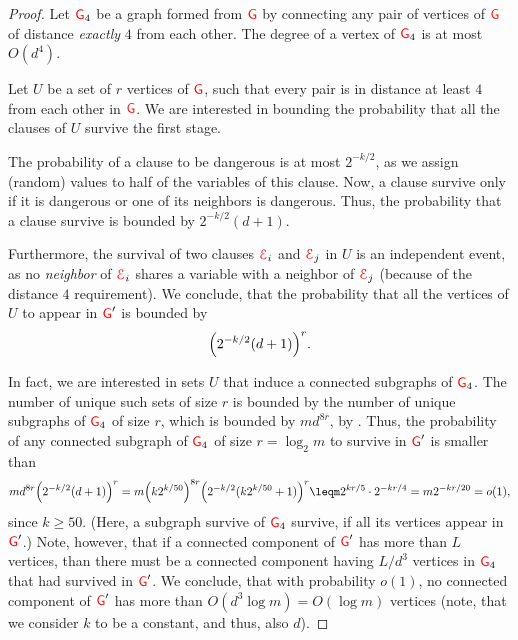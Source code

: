 \begin{proof}
    Let ${\textcolor{red}{\mathsf{G}}}_4$ be a graph formed from ${\textcolor{red}{\mathsf{G}}}$ by connecting any
    pair of vertices of ${\textcolor{red}{\mathsf{G}}}$ of distance {\em exactly} $4$
    from each other. The degree of a vertex of ${\textcolor{red}{\mathsf{G}}}_4$ is at
    most $O(d^4)$. 

    Let $U$ be a set of $r$ vertices of ${\textcolor{red}{\mathsf{G}}}$, such that
    every pair is in distance at least $4$ from each other
    in ${\textcolor{red}{\mathsf{G}}}$. We are interested in bounding the probability
    that all the clauses of $U$ survive the first stage. 
    
    The probability of a clause to be dangerous is at most $2^{-k/2}$,
    as we assign (random) values to half of the variables of this
    clause. Now, a clause survive only if it is dangerous or one of
    its neighbors is dangerous.  Thus, the probability that a clause
    survive is bounded by $2^{-k/2}(d+1)$. 

    Furthermore, the survival of two clauses ${\textcolor{red}{\EuScript{E}}}_i$ and ${\textcolor{red}{\EuScript{E}}}_j$ in $U$ is
    an independent event, as no \emph{neighbor} of ${\textcolor{red}{\EuScript{E}}}_i$ shares a
    variable with a neighbor of ${\textcolor{red}{\EuScript{E}}}_j$ (because of the distance $4$
    requirement). We conclude, that the probability that all the
    vertices of $U$ to appear in ${\textcolor{red}{\mathsf{G}}}'$ is bounded by
    \begin{align*}
    \pth{2^{-k/2}(d+1)}^{r}.
    \end{align*}
    
    In fact, we are interested in sets $U$ that induce a connected
    subgraphs of ${\textcolor{red}{\mathsf{G}}}_4$. The number  of unique such sets of size $r$ is
    bounded by the number of unique subgraphs of ${\textcolor{red}{\mathsf{G}}}_4$ of size $r$,
    which is bounded by $m d^{8r}$, by . Thus,
    the probability of any connected subgraph of ${\textcolor{red}{\mathsf{G}}}_4$ of size $r =
    \log_2 {m}$ to survive in ${\textcolor{red}{\mathsf{G}}}'$ is smaller than
    \begin{align*}
        m d^{8r} \pth{2^{-k/2}(d+1)}^{r}%
        =%
        m \pth{k2^{k/50}}^{8r } \pth{2^{-k/2}(k2^{k/50}+1)}^{r}%
        \leq%
        m 2^{kr/5} \cdot 2^{-kr/4}%
        =%
        m 2^{-kr/20}%
        =%
        o(1),
    \end{align*}
    since $k \geq 50$.  (Here, a subgraph survive of ${\textcolor{red}{\mathsf{G}}}_4$
    survive, if all its vertices appear in ${\textcolor{red}{\mathsf{G}}}'$.)  Note, however,
    that if a connected component of ${\textcolor{red}{\mathsf{G}}}'$ has more than $L$
    vertices, than there must be a connected component having $L/d^3$
    vertices in ${\textcolor{red}{\mathsf{G}}}_4$ that had survived in ${\textcolor{red}{\mathsf{G}}}'$. We
    conclude, that with probability $o(1)$, no connected component of
    ${\textcolor{red}{\mathsf{G}}}'$ has more than $O(d^3 \log{m}) = O(\log{m})$ vertices
    (note, that we consider $k$ to be a constant, and thus, also $d$).
\end{proof}

